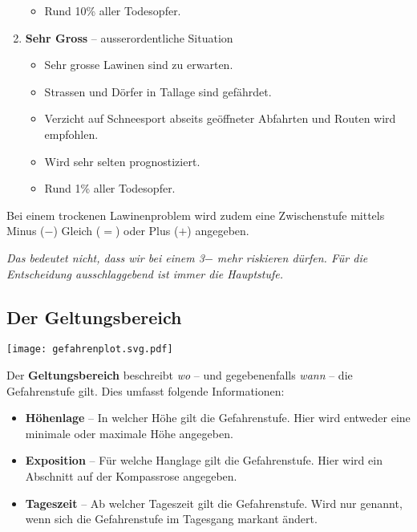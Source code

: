 \begin{enumerate}
{\begin{itemize}
      \item{Rund 10\% aller Todesopfer.}
    \end{itemize}
  }
  \item{
    \textbf{Sehr Gross} -- ausserordentliche Situation
    \begin{itemize}
      \item{Sehr grosse Lawinen sind zu erwarten.}
      \item{Strassen und Dörfer in Tallage sind gefährdet.}
      \item{Verzicht auf Schneesport abseits geöffneter Abfahrten und Routen wird empfohlen.}
      \item{Wird sehr selten prognostiziert.}
      \item{Rund 1\% aller Todesopfer.}
    \end{itemize}
  }
\end{enumerate}

\newcolumn

Bei einem trockenen Lawinenproblem wird zudem eine Zwischenstufe mittels Minus ($-$) Gleich ($=$) oder Plus ($+$) angegeben.

\textit{Das bedeutet nicht, dass wir bei einem 3$-$ mehr riskieren dürfen. Für die Entscheidung ausschlaggebend ist immer die Hauptstufe.}

\subsection{Der Geltungsbereich}

\begin{center}
  \texttt{[image: gefahrenplot.svg.pdf]}
\end{center}

Der \textbf{Geltungsbereich} beschreibt \textit{wo} -- und gegebenenfalls \textit{wann} -- die Gefahrenstufe gilt.
Dies umfasst folgende Informationen:

\begin{itemize}
  \item{\textbf{Höhenlage} -- In welcher Höhe gilt die Gefahrenstufe. Hier wird entweder eine minimale oder maximale Höhe angegeben.}
  \item{\textbf{Exposition} -- Für welche Hanglage gilt die Gefahrenstufe. Hier wird ein Abschnitt auf der Kompassrose angegeben.}
  \item{\textbf{Tageszeit} -- Ab welcher Tageszeit gilt die Gefahrenstufe. Wird nur genannt, wenn sich die Gefahrenstufe im Tagesgang markant ändert.}
\end{itemize}

